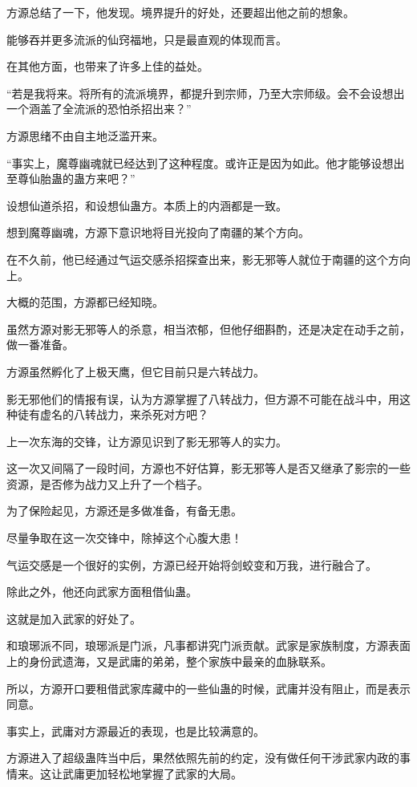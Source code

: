 \begin{this_body}
方源总结了一下，他发现。境界提升的好处，还要超出他之前的想象。

能够吞并更多流派的仙窍福地，只是最直观的体现而言。

在其他方面，也带来了许多上佳的益处。

“若是我将来。将所有的流派境界，都提升到宗师，乃至大宗师级。会不会设想出一个涵盖了全流派的恐怕杀招出来？”

方源思绪不由自主地泛滥开来。

“事实上，魔尊幽魂就已经达到了这种程度。或许正是因为如此。他才能够设想出至尊仙胎蛊的蛊方来吧？”

设想仙道杀招，和设想仙蛊方。本质上的内涵都是一致。

想到魔尊幽魂，方源下意识地将目光投向了南疆的某个方向。

在不久前，他已经通过气运交感杀招探查出来，影无邪等人就位于南疆的这个方向上。

大概的范围，方源都已经知晓。

虽然方源对影无邪等人的杀意，相当浓郁，但他仔细斟酌，还是决定在动手之前，做一番准备。

方源虽然孵化了上极天鹰，但它目前只是六转战力。

影无邪他们的情报有误，认为方源掌握了八转战力，但方源不可能在战斗中，用这种徒有虚名的八转战力，来杀死对方吧？

上一次东海的交锋，让方源见识到了影无邪等人的实力。

这一次又间隔了一段时间，方源也不好估算，影无邪等人是否又继承了影宗的一些资源，是否修为战力又上升了一个档子。

为了保险起见，方源还是多做准备，有备无患。

尽量争取在这一次交锋中，除掉这个心腹大患！

气运交感是一个很好的实例，方源已经开始将剑蛟变和万我，进行融合了。

除此之外，他还向武家方面租借仙蛊。

这就是加入武家的好处了。

和琅琊派不同，琅琊派是门派，凡事都讲究门派贡献。武家是家族制度，方源表面上的身份武遗海，又是武庸的弟弟，整个家族中最亲的血脉联系。

所以，方源开口要租借武家库藏中的一些仙蛊的时候，武庸并没有阻止，而是表示同意。

事实上，武庸对方源最近的表现，也是比较满意的。

方源进入了超级蛊阵当中后，果然依照先前的约定，没有做任何干涉武家内政的事情来。这让武庸更加轻松地掌握了武家的大局。


\end{this_body}
